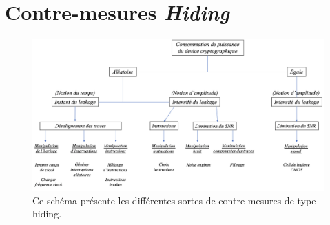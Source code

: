 \documentclass[10pt, oneside, a4paper]{article}
\begin{document}
\newpage









\newpage

\section{Contre-mesures \textit{Hiding}}
\label{ann:resume_hiding}
\begin{figure}[htb]
    \centering
    \includegraphics[width=1.2\linewidth, angle=90]{image/resume_hiding}
    \caption{Ce schéma présente les différentes sortes de contre-mesures de type hiding.}
    \label{fig:resume_hiding} 
\end{figure}
\end{document}
